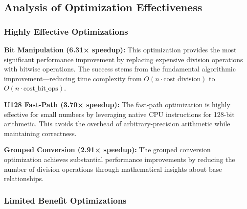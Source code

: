 \documentclass[10pt]{article}
\begin{document}
\begin{table}[H]
\centering
\caption{Performance Benchmark Results}
\label{tab:performance}
\end{table}

\subsection{Analysis of Optimization Effectiveness}

\subsubsection{Highly Effective Optimizations}

\textbf{Bit Manipulation (6.31× speedup):} This optimization provides the most significant performance improvement by replacing expensive division operations with bitwise operations. The success stems from the fundamental algorithmic improvement—reducing time complexity from $O(n \cdot \text{cost\_division})$ to $O(n \cdot \text{cost\_bit\_ops})$.

\textbf{U128 Fast-Path (3.70× speedup):} The fast-path optimization is highly effective for small numbers by leveraging native CPU instructions for 128-bit arithmetic. This avoids the overhead of arbitrary-precision arithmetic while maintaining correctness.

\textbf{Grouped Conversion (2.91× speedup):} The grouped conversion optimization achieves substantial performance improvements by reducing the number of division operations through mathematical insights about base relationships.

\subsubsection{Limited Benefit Optimizations}
\end{document}
